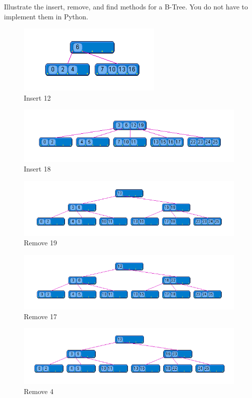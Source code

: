 \begin{problem}
Illustrate the insert, remove, and find methods for a B-Tree.  You do not have to implement them in Python.

\begin{figure}[H]
\centering
\includegraphics[width=.5\textwidth]{3.png} \\
Insert 12
\end{figure}

\begin{figure}[H]
\centering
\includegraphics[width=\textwidth]{8.png}
Insert 18
\end{figure}

\begin{figure}[H]
\centering
\includegraphics[width=\textwidth]{10.png}
Remove 19
\end{figure}

\begin{figure}[H]
\centering
\includegraphics[width=\textwidth]{11.png}
Remove 17
\end{figure}

\begin{figure}[H]
\centering
\includegraphics[width=\textwidth]{12.png}
Remove 4
\end{figure}

\end{problem}
